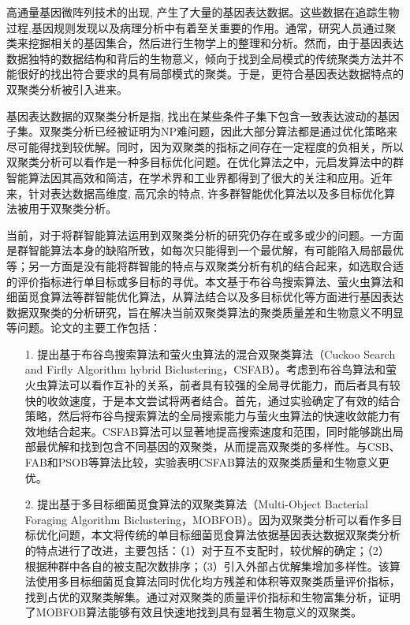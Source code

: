 \begin{cabstract}
  高通量基因微阵列技术的出现, 产生了大量的基因表达数据。这些数据在追踪生物过程,基因规则发现以及病理分析中有着至关重要的作用。通常，研究人员通过聚类来挖掘相关的基因集合，然后进行生物学上的整理和分析。然而，由于基因表达数据独特的数据结构和背后的生物意义，倾向于找到全局模式的传统聚类方法并不能很好的找出符合要求的具有局部模式的聚类。于是，更符合基因表达数据特点的双聚类分析被引入进来。
  
  基因表达数据的双聚类分析是指, 找出在某些条件子集下包含一致表达波动的基因子集。双聚类分析已经被证明为NP难问题，因此大部分算法都是通过优化策略来尽可能得找到较优解。同时，因为双聚类的指标之间存在一定程度的负相关，所以双聚类分析可以看作是一种多目标优化问题。在优化算法之中，元启发算法中的群智能算法因其高效和简洁，在学术界和工业界都得到了很大的关注和应用。近年来，针对表达数据高维度, 高冗余的特点, 许多群智能优化算法以及多目标优化算法被用于双聚类分析。

  当前，对于将群智能算法运用到双聚类分析的研究仍存在或多或少的问题。一方面是群智能算法本身的缺陷所致，如每次只能得到一个最优解，有可能陷入局部最优等；另一方面是没有能将群智能的特点与双聚类分析有机的结合起来，如选取合适的评价指标进行单目标或多目标的寻优。本文基于布谷鸟搜索算法、萤火虫算法和细菌觅食算法等群智能优化算法，从算法结合以及多目标优化等方面进行基因表达数据双聚类的分析研究，旨在解决当前双聚类算法的聚类质量差和生物意义不明显等问题。论文的主要工作包括：

  \begin{itemize}
    \item[1.] 提出基于布谷鸟搜索算法和萤火虫算法的混合双聚类算法（Cuckoo Search and Firfly Algorithm hybrid Biclustering，CSFAB）。考虑到布谷鸟算法和萤火虫算法可以看作互补的关系，前者具有较强的全局寻优能力，而后者具有较快的收敛速度，于是本文尝试将两者结合。首先，通过实验确定了有效的结合策略，然后将布谷鸟搜索算法的全局搜索能力与萤火虫算法的快速收敛能力有效地结合起来。CSFAB算法可以显著地提高搜索速度和范围，同时能够跳出局部最优解和找到包含不同基因的双聚类，从而提高双聚类的多样性。与CSB、FAB和PSOB等算法比较，实验表明CSFAB算法的双聚类质量和生物意义更优。

    \item[2.] 提出基于多目标细菌觅食算法的双聚类算法（Multi-Object Bacterial Foraging Algorithm Biclustering，MOBFOB）。因为双聚类分析可以看作多目标优化问题，本文将传统的单目标细菌觅食算法依据基因表达数据双聚类分析的特点进行了改进，主要包括：（1）对于互不支配时，较优解的确定；（2） 根据种群中各自的被支配次数排序；（3）引入外部占优解集增加多样性。该算法使用多目标细菌觅食算法同时优化均方残差和体积等双聚类质量评价指标，找到占优的双聚类解集。通过对双聚类的质量评价指标和生物富集分析，证明了MOBFOB算法能够有效且快速地找到具有显著生物意义的双聚类。
  \end{itemize}


\end{cabstract}

